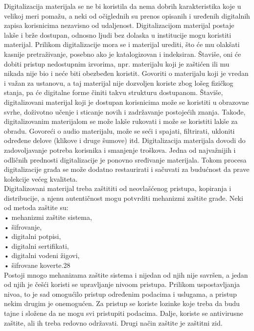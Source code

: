 \documentclass[11pt]{article}
\begin{document}
Digitalizacija materijala se ne bi koristila da nema dobrih karakteristika koje u velikoj meri pomažu,
a neki od očiglednih su prenos opisanih i uređenih digitalnih zapisa korisnicima nezavisno od
udaljenost.
Digitalizacijom materijal postaje lakše i brže dostupan, odnosno ljudi bez dolaska u
institucije mogu koristiti materijal. Prilikom digitalizacije mora se i materijal urediti, što će mu olakšati kasnije pretraživanje, posebno ako je katalogizovan i indeksiran. Štaviše, oni će dobiti
pristup nedostupnim izvorima, npr. materijalu koji je zaštićen ili mu nikada nije bio i neće biti obezbeđen
koristit. Govoriti o materijalu koji je vredan i važan za ustanovu, a taj materijal nije dozvoljen
koriste zbog lošeg fizičkog stanja, pa će digitalne forme činiti takvu strukturu
dostupanom. Štaviše, digitalizovani materijal koji je dostupan korisnicima može se koristiti u
obrazovne svrhe, doživotno učenje i sticanje novih i zadržavanje postojećih znanja. Takođe, digitalizovanim materijalom se može lakše rukovati i može se koristiti lakše za obradu. Govoreći o audio materijalu, može se seći i spajati, filtrirati, ukloniti određene delove (klikove i druge šumove) itd. Digitalizacija materijala dovodi do zadovoljavanje potreba korisnika i smanjenje troškova. Jedna od najvažnijih i odličnih prednosti digitalizacije je ponovno sređivanje materijala. Tokom procesa digitalizacije građa se može dodatno restaurirati i sačuvati za budućnost da prave kolekcije većeg kvaliteta. \\

Digitalizovani materijal treba zaštititi od neovlašćenog pristupa, kopiranja i
distribucije, a njenu autentičnost mogu potvrditi mehanizmi zaštite građe. Neki
od metoda zaštite su: \\
• mehanizmi zaštite sistema, \\
• šifrovanje, \\
• digitalni potpisi, \\
• digitalni sertifikati, \\
• digitalni vodeni žigovi, \\
• šifrovane koverte.28 \\
Postoji mnogo mehanizama zaštite sistema i nijedan od njih nije savršen, a jedan od njih je češći
koristi se upravljanje nivoom pristupa. Prilikom uspostavljanja nivoa, to je sad omogućilo
pristup određenim podacima i uslugama, a pristup  nekim drugim je onemogućen. Za pristup se koriste lozinke koje treba da budu tajne i složene da ne mogu svi pristupiti podacima. Dalje, koriste se antivirusne zaštite, ali ih treba redovno održavati. Drugi način zaštite je zaštitni zid.
\end{document}
